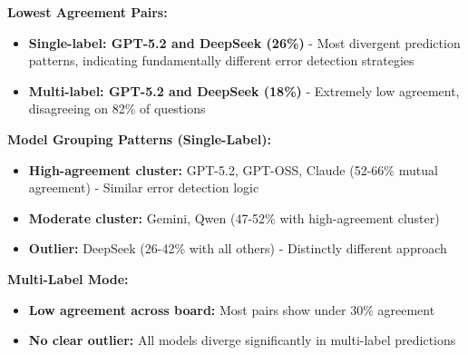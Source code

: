 \documentclass[12pt,a4paper]{article}
\begin{document}
\textbf{Lowest Agreement Pairs:}
\begin{itemize}[leftmargin=*]
    \item \textbf{Single-label: GPT-5.2 and DeepSeek (26\%)} - Most divergent prediction patterns, indicating fundamentally different error detection strategies
    
    
    \item \textbf{Multi-label: GPT-5.2 and DeepSeek (18\%)} - Extremely low agreement, disagreeing on 82\% of questions
    
\end{itemize}

\textbf{Model Grouping Patterns (Single-Label):}
\begin{itemize}[leftmargin=*]
    \item \textbf{High-agreement cluster:} GPT-5.2, GPT-OSS, Claude (52-66\% mutual agreement) - Similar error detection logic
    \item \textbf{Moderate cluster:} Gemini, Qwen (47-52\% with high-agreement cluster)
    \item \textbf{Outlier:} DeepSeek (26-42\% with all others) - Distinctly different approach
\end{itemize}

\textbf{Multi-Label Mode:}
\begin{itemize}[leftmargin=*]
    \item \textbf{Low agreement across board:} Most pairs show under 30\% agreement
    \item \textbf{No clear outlier:} All models diverge significantly in multi-label predictions
\end{itemize}



\end{document}
